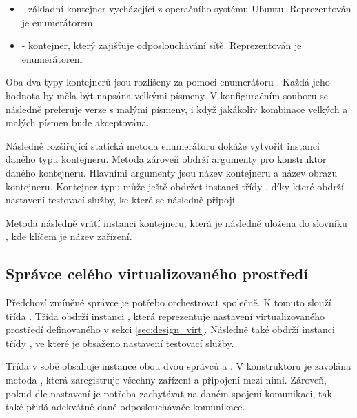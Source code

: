 \begin{itemize}
    \item {} - základní kontejner vycházející z operačního systému Ubuntu. Reprezentován je enumerátorem  
    \item {} - kontejner, který zajišťuje odposlouchávání sítě. Reprezentován je enumerátorem 
\end{itemize}

Oba dva typy kontejnerů jsou rozlišeny za pomoci enumerátoru . Každá jeho hodnota by měla být napsána velkými písmeny. V konfiguračním souboru se následně preferuje verze s malými písmeny, i když jakákoliv kombinace velkých a malých písmen bude akceptována. 

Následně rozšiřující statická metoda enumerátoru  dokáže vytvořit instanci daného typu kontejneru. Metoda zároveň obdrží argumenty pro konstruktor daného kontejneru. Hlavními argumenty jsou název kontejneru a název obrazu kontejneru. Kontejner typu  může ještě obdržet instanci třídy , díky které obdrží nastavení testovací služby, ke které se následně připojí. 

Metoda  následně vrátí instanci kontejneru, která je následně uložena do slovníku , kde klíčem je název zařízení. 

\subsection{Správce celého virtualizovaného prostředí}

Předchozí zmíněné správce je potřebo orchestrovat společně. K tomuto slouží třída . Třída obdrží instanci , která reprezentuje nastavení virtualizovaného prostředí definovaného v sekci \ref{sec:design_virt}. Následně také obdrží instanci třídy , ve které je obsaženo nastavení testovací služby.

Třída v sobě obsahuje instance obou dvou správců  a . V konstruktoru je zavolána metoda , která zaregistruje všechny zařízení a připojení mezi nimi. Zároveň, pokud dle nastavení je potřeba zachytávat na daném spojení komunikaci, tak také přidá adekvátně dané odposlouchávače komunikace. 


